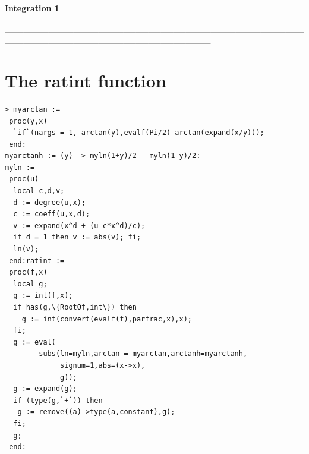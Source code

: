 \documentclass{article}
\begin{document}
\lstset{basicstyle=\ttfamily,breaklines=true,columns=flexible}
\pagestyle{empty}
\begin{center}
\begin{Maple Normal}
\underline{\textbf{Integration 1}}
\end{Maple Normal}
\end{center}
\begin{Maple Normal}
\_\_\_\_\_\_\_\_\_\_\_\_\_\_\_\_\_\_\_\_\_\_\_\_\_\_\_\_\_\_\_\_\_\_\_\_\_\_\_\_\_\_\_\_\_\_\_\_\_\_\_\_\_\_\_\_\_\_\_\_\_\_\_\_\_\_\_\_\_\_\_\_\_\_\_\_\_\_\_\_\_
\end{Maple Normal}
\section{\textbf{The }\textcolor[RGB]{255,0,0}{\textbf{ratint}}\textbf{ function}}
\begin{lstlisting}
> myarctan := 
 proc(y,x) 
  `if`(nargs = 1, arctan(y),evalf(Pi/2)-arctan(expand(x/y)));
 end:
myarctanh := (y) -> myln(1+y)/2 - myln(1-y)/2:
myln := 
 proc(u)
  local c,d,v;
  d := degree(u,x);
  c := coeff(u,x,d);
  v := expand(x^d + (u-c*x^d)/c);
  if d = 1 then v := abs(v); fi;
  ln(v);
 end:ratint := 
 proc(f,x)
  local g;
  g := int(f,x);
  if has(g,\{RootOf,int\}) then 
    g := int(convert(evalf(f),parfrac,x),x);
  fi;
  g := eval(
        subs(ln=myln,arctan = myarctan,arctanh=myarctanh,
             signum=1,abs=(x->x),
             g));
  g := expand(g);
  if (type(g,`+`)) then 
   g := remove((a)->type(a,constant),g);
  fi;
  g;
 end:
\end{lstlisting}
\end{document}
